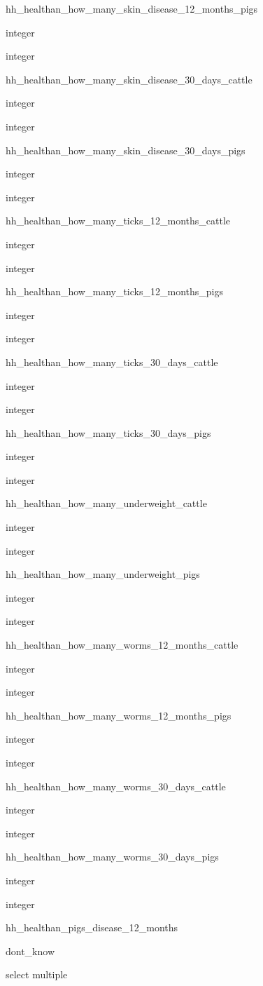 \documentclass[]{article}
\begin{document}
hh\_healthan\_how\_many\_skin\_disease\_12\_months\_pigs

integer

integer

hh\_healthan\_how\_many\_skin\_disease\_30\_days\_cattle

integer

integer

hh\_healthan\_how\_many\_skin\_disease\_30\_days\_pigs

integer

integer

hh\_healthan\_how\_many\_ticks\_12\_months\_cattle

integer

integer

hh\_healthan\_how\_many\_ticks\_12\_months\_pigs

integer

integer

hh\_healthan\_how\_many\_ticks\_30\_days\_cattle

integer

integer

hh\_healthan\_how\_many\_ticks\_30\_days\_pigs

integer

integer

hh\_healthan\_how\_many\_underweight\_cattle

integer

integer

hh\_healthan\_how\_many\_underweight\_pigs

integer

integer

hh\_healthan\_how\_many\_worms\_12\_months\_cattle

integer

integer

hh\_healthan\_how\_many\_worms\_12\_months\_pigs

integer

integer

hh\_healthan\_how\_many\_worms\_30\_days\_cattle

integer

integer

hh\_healthan\_how\_many\_worms\_30\_days\_pigs

integer

integer

hh\_healthan\_pigs\_disease\_12\_months

dont\_know

select multiple
\end{document}
